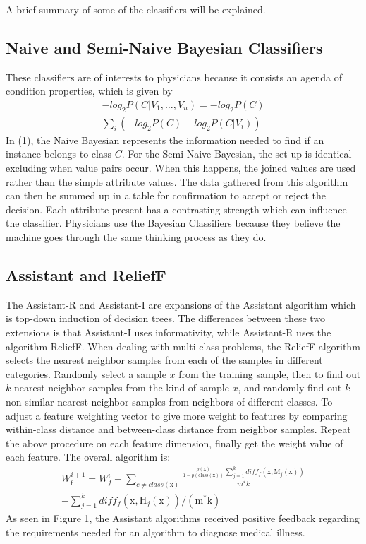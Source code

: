 \documentclass[11pt,technote,twocolumn]{IEEEtran}
\begin{document}
A brief summary of some of the classifiers will be explained.

\subsection{Naive and Semi-Naive Bayesian Classifiers}
These classifiers are of interests to physicians because it consists an agenda of condition properties, which is given by
\begin{align*}\tag{1}
    -log_2P(C|V_1, \ldots, V_n) = -log_2P(C)
    \\
    \sum_{i}(-log_2P(C) + log_2P(C|V_i))
\end{align*}
In (1), the Naive Bayesian represents the information needed to find if an instance belongs to class $C$. For the Semi-Naive Bayesian, the set up is identical excluding when value pairs occur. When this happens, the joined values are used rather than the simple attribute values. The data gathered from this algorithm can then be summed up in a table for confirmation to accept or reject the decision. Each attribute present has a contrasting strength which can influence the classifier. Physicians use the Bayesian Classifiers because they believe the machine goes through the same thinking process as they do.
\subsection{Assistant and ReliefF}
The Assistant-R and Assistant-I are expansions of the Assistant algorithm which is top-down induction of decision trees. The differences between these two extensions is that Assistant-I uses informativity, while Assistant-R uses the algorithm ReliefF. When dealing with multi class problems, the ReliefF algorithm selects the nearest neighbor samples from each of the samples in different categories. Randomly select a sample $x$ from the training sample, then to find out $k$ nearest neighbor samples from the kind of sample $x$, and randomly find out $k$ non similar nearest neighbor samples from neighbors of different classes. To adjust a feature weighting vector to give more weight to features by comparing within-class distance and between-class distance from neighbor samples. Repeat the above procedure on each feature dimension, finally get the weight value of each feature.\cite{7729190} The overall algorithm is:
{\small{
\begin{align*} \tag{2}
    W_{\mathrm{f}}^{i+1}= W_{f}^{i}+ \sum\limits_{{c}\neq class(\mathrm{x})}\frac{\frac{p(\mathrm{x})}{1-p(\text{class}(\mathrm{x}))}\sum\limits_{j=1}^{k} diff_{f}(\mathrm{x},\mathrm{M}_{j}(\mathrm{x}))}{m^{\ast}k} 
    \\
    - \sum\limits_{j=1}^{k}diff_{f}(\mathrm{x},\mathrm{H}_{j}(\mathrm{x}))/(\mathrm{m}^{\ast}\mathrm{k})
\end{align*}}}%
As seen in Figure 1, the Assistant algorithms received positive feedback regarding the requirements needed for an algorithm to diagnose medical illness. 
\end{document}
